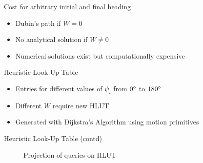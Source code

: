 \documentclass{beamer}
\begin{document}
\begin{frame}{Cost for arbitrary initial and final heading}
    \begin{itemize}
        \item Dubin's path if $W=0$
        \item No analytical solution if $W\neq0$
        \item Numerical solutions exist but computationally expensive
    \end{itemize}
\end{frame}

\begin{frame}{Heuristic Look-Up Table}
    \begin{itemize}
        \item Entries for different values of $\psi_i$ from $0\degree$ to $180\degree$
        \item Different $W$ require new HLUT
        \item Generated with Dijkstra's Algorithm using motion primitives
    \end{itemize}
\end{frame}

\begin{frame}{Heuristic Look-Up Table (contd)}
    \begin{figure}
        \begin{center}
        \end{center}
        \caption{Projection of queries on HLUT}
        \label{fig:hlut_proj}
    \end{figure}
\end{frame}
\end{document}
